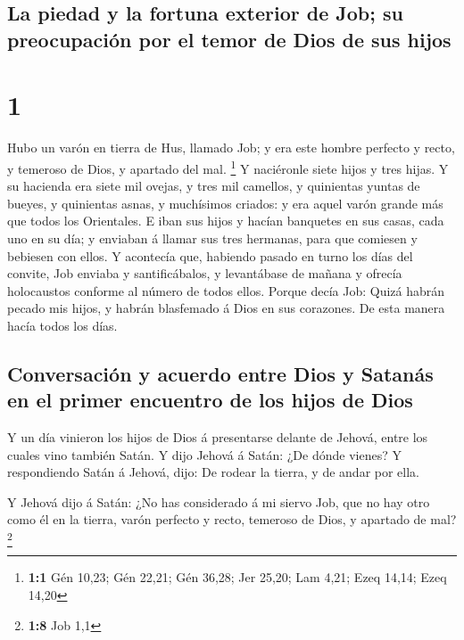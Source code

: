 \hypertarget{la-piedad-y-la-fortuna-exterior-de-job-su-preocupaciuxf3n-por-el-temor-de-dios-de-sus-hijos}{%
\subsection{La piedad y la fortuna exterior de Job; su preocupación por
el temor de Dios de sus
hijos}\label{la-piedad-y-la-fortuna-exterior-de-job-su-preocupaciuxf3n-por-el-temor-de-dios-de-sus-hijos}}

\hypertarget{section}{%
\section{1}\label{section}}

 Hubo un varón en tierra de Hus, llamado Job; y era este
hombre perfecto y recto, y temeroso de Dios, y apartado del mal.
\footnote{\textbf{1:1} Gén 10,23; Gén 22,21; Gén 36,28; Jer 25,20; Lam
  4,21; Ezeq 14,14; Ezeq 14,20}  Y naciéronle siete hijos y
tres hijas.  Y su hacienda era siete mil ovejas, y tres mil
camellos, y quinientas yuntas de bueyes, y quinientas asnas, y
muchísimos criados: y era aquel varón grande más que todos los
Orientales.  E iban sus hijos y hacían banquetes en sus
casas, cada uno en su día; y enviaban á llamar sus tres hermanas, para
que comiesen y bebiesen con ellos.  Y acontecía que,
habiendo pasado en turno los días del convite, Job enviaba y
santificábalos, y levantábase de mañana y ofrecía holocaustos conforme
al número de todos ellos. Porque decía Job: Quizá habrán pecado mis
hijos, y habrán blasfemado á Dios en sus corazones. De esta manera hacía
todos los días.

\hypertarget{conversaciuxf3n-y-acuerdo-entre-dios-y-satanuxe1s-en-el-primer-encuentro-de-los-hijos-de-dios}{%
\subsection{Conversación y acuerdo entre Dios y Satanás en el primer
encuentro de los hijos de
Dios}\label{conversaciuxf3n-y-acuerdo-entre-dios-y-satanuxe1s-en-el-primer-encuentro-de-los-hijos-de-dios}}

 Y un día vinieron los hijos de Dios á presentarse delante
de Jehová, entre los cuales vino también Satán.  Y dijo
Jehová á Satán: ¿De dónde vienes? Y respondiendo Satán á Jehová, dijo:
De rodear la tierra, y de andar por ella.

 Y Jehová dijo á Satán: ¿No has considerado á mi siervo Job,
que no hay otro como él en la tierra, varón perfecto y recto, temeroso
de Dios, y apartado de mal? \footnote{\textbf{1:8} Job 1,1}

